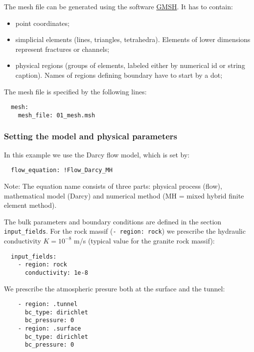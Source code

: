 The mesh file can be generated using the software
\href{http://www.gmsh.info}{GMSH}. It has to contain:

\begin{itemize}
\tightlist
\item
  point coordinates;
\item
  simplicial elements (lines, triangles, tetrahedra). Elements of lower
  dimensions represent fractures or channels;
\item
  physical regions (groups of elements, labeled either by numerical id
  or string caption). Names of regions defining boundary have to start
  by a dot;
\end{itemize}

The mesh file is specified by the following lines:

\begin{verbatim}
  mesh:
    mesh_file: 01_mesh.msh
\end{verbatim}

\subsubsection{Setting the model and physical parameters}

In this example we use the Darcy flow model, which is set by:

\begin{verbatim}
  flow_equation: !Flow_Darcy_MH
\end{verbatim}

Note: The equation name consists of three parts: physical process
(flow), mathematical model (Darcy) and numerical method (MH = mixed
hybrid finite element method).

The bulk parameters and boundary conditions are defined in the section
\texttt{input\_fields}. For the rock massif (\texttt{-\ region:\ rock})
we prescribe the hydraulic conductivity \(K = 10^{-8}\) m/s (typical
value for the granite rock massif):

\begin{verbatim}
  input_fields:
    - region: rock
      conductivity: 1e-8
\end{verbatim}

We prescribe the atmospheric presure both at the surface and the tunnel:

\begin{verbatim}
    - region: .tunnel
      bc_type: dirichlet
      bc_pressure: 0
    - region: .surface
      bc_type: dirichlet
      bc_pressure: 0
\end{verbatim}

